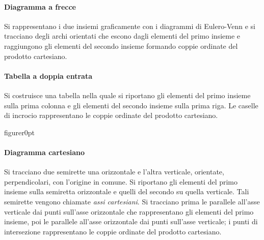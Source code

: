 {\paragraph{Diagramma a frecce}
Si rappresentano i due insiemi graficamente
con i diagrammi di Eulero-Venn e si tracciano degli archi orientati che
escono dagli elementi del primo insieme e raggiungono gli elementi del
secondo insieme formando coppie ordinate del prodotto cartesiano.
\begin{center}

\end{center}

\begin{minipage}{.34 \textwidth}
\begin{center}
 
\end{center}
\end{minipage}
\hfill
\begin{minipage}{.64 \textwidth}
\paragraph{Tabella a doppia entrata}
Si costruisce una tabella nella quale si riportano gli elementi del
primo insieme sulla prima colonna e gli elementi del secondo insieme
sulla prima riga. Le caselle di incrocio rappresentano le coppie
ordinate del prodotto cartesiano.
\end{minipage}


\begin{wrapfloat}{figure}{r}{0pt}
 
\end{wrapfloat}

\paragraph{Diagramma cartesiano}
Si tracciano due semirette una orizzontale e l'altra
verticale, orientate, perpendicolari, con l'origine
in comune. Si riportano gli elementi del primo insieme sulla semiretta
orizzontale e quelli del secondo su quella verticale. Tali semirette
vengono chiamate \emph{assi cartesiani}. Si tracciano prima le
parallele all'asse verticale dai punti
sull'asse orizzontale che rappresentano gli elementi
del primo insieme, poi le parallele all'asse
orizzontale dai punti sull'asse verticale; i punti di
intersezione rappresentano le coppie ordinate del prodotto
cartesiano.

\begin{minipage}{.59 \textwidth}
\begin{center}

\end{center}
\end{minipage}
\hfill
\begin{minipage}{.39 \textwidth}

\end{minipage}}
